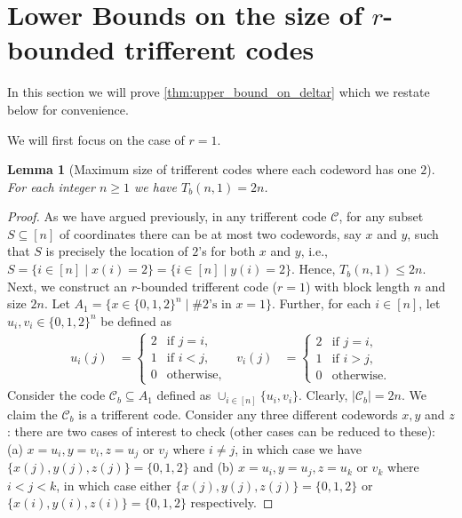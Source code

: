 \documentclass[10pt,a4paper]{article}
\newcommand{\rbdtrifferentcodes}{$r$-bounded trifferent code}
\newcommand{\calC}{\mathcal{C}}
\newcommand{\set}[1]{\{#1\}}
\newtheorem{lemma}[theorem]{Lemma}
\DeclareMathOperator{\1}{\mathbf{1}}
\begin{document}
\section{Lower Bounds on the size of \rbdtrifferentcodes{s}}
\label{sec:lower_bounds_rbdtrifferent_codes}

In this section we will prove \cref{thm:upper_bound_on_deltar}  which we restate below for convenience.

\upperboundondeltar*

We will first focus on the case of $r=1$.
\begin{lemma}[Maximum size of trifferent codes where each codeword has one $2$]
\label{lem:one_bounded_triff_codes}
    For each integer $n\geq 1$ we have $T_b(n,1)=2n$.
\end{lemma}
\begin{proof}
    As we have argued previously, in any trifferent code $\calC$, for any subset $S\subseteq [n]$ of coordinates there can be at most two codewords, say $x$ and $y$, such that $S$ is precisely the location of $2$'s for both $x$ and $y$, i.e., $S=\set{i\in [n]\mid x(i)=2}=\set{i\in [n]\mid y(i)=2}$.  Hence, $T_b(n,1)\leq 2n$.
    Next, we construct an \rbdtrifferentcodes{} ($r=1$) with block length $n$ and size $2n$. 
    Let $A_1 = \{x \in \{0,1,2\}^n \mid \# 2\text{'s in } x = 1\}$. Further, for each $i \in [n]$, let $u_i, v_i \in \{0,1,2\}^n$ be defined as 
    \[
    \begin{aligned}
    u_i(j) &= \begin{cases} 
      2 & \text{if } j = i, \\
      1 & \text{if } i < j, \\
      0 & \text{otherwise},
    \end{cases}
    &
    v_i(j) &= \begin{cases} 
      2 & \text{if } j = i, \\
      1 & \text{if } i > j, \\
      0 & \text{otherwise}.
    \end{cases}
    \end{aligned}
    \]
    Consider the code $\mathcal{C}_b \subseteq A_1$ defined as $\cup_{i \in [n]} \{u_i, v_i\}$. Clearly, $|\calC_b|=2n$. We claim the $\calC_b$ is a trifferent code. Consider any three different codewords $x,y$ and $z$: there are two cases of interest to check (other cases can be reduced to these): (a) $x=u_i,y=v_i,z=u_j\text{ or }v_j$ where $i\neq j$, in which case we have $\set{x(j),y(j),z(j)}=\set{0,1,2}$ and (b) $x=u_i,y=u_j,z=u_k\text{ or }v_k$ where $i<j<k$, in which case either $\set{x(j),y(j),z(j)}=\set{0,1,2}$ or $\set{x(i),y(i),z(i)}=\set{0,1,2}$ respectively. 
\end{proof}
\end{document}
